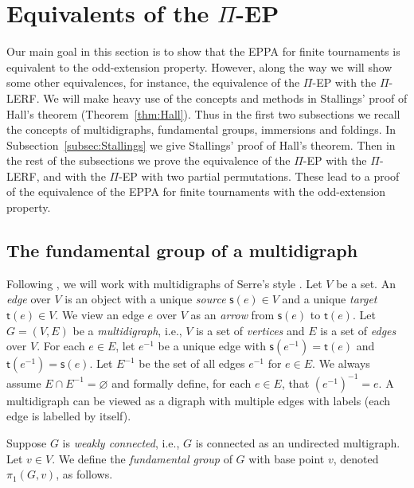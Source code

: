 \documentclass[10pt,a4paper]{amsart}
\theoremstyle{definition}
\theoremstyle{definition}
\numberwithin{equation}{section}
\begin{document}
\section{Equivalents of the $\Pi$-EP}
Our main goal in this section is to show that the EPPA for finite tournaments is equivalent to the odd-extension property. However, along the way we will show some other equivalences, for instance, the equivalence of the $\Pi$-EP with the $\Pi$-LERF. We will make heavy use of the concepts and methods in Stallings' proof \cite[Corollary 6.3]{St83} of Hall's theorem \cite{Ha49} (Theorem~\ref{thm:Hall}). Thus in the first two subsections we recall the concepts of multidigraphs, fundamental groups, immersions and foldings. In Subsection~\ref{subsec:Stallings} we give Stallings' proof of Hall's theorem. Then in the rest of the subsections we prove the equivalence of the $\Pi$-EP with the $\Pi$-LERF, and with the $\Pi$-EP with two partial permutations. These lead to a proof of the equivalence of the EPPA for finite tournaments with the odd-extension property. 




\subsection{The fundamental group of a multidigraph\label{subsec:multidigraph}} Following \cite{St83}, we will work with multidigraphs of Serre's style \cite{SerreBook}. Let $V$ be a set. An {\em edge} over $V$ is an object with a unique {\em source} $\mathsf{s}(e)\in V$ and a unique {\em target} $\mathsf{t}(e)\in V$. We view an edge $e$ over $V$ as an {\em arrow} from $\mathsf{s}(e)$ to $\mathsf{t}(e)$. Let $G=(V,E)$ be a {\em multidigraph}, i.e., $V$ is a set of {\em vertices} and $E$ is a set of {\em edges} over $V$.  For each $e\in E$, let $e^{-1}$ be a unique edge with $\mathsf{s}(e^{-1})=\mathsf{t}(e)$ and $\mathsf{t}(e^{-1})=\mathsf{s}(e)$. Let $E^{-1}$ be the set of all edges $e^{-1}$ for $e\in E$. We always assume $E\cap E^{-1}=\varnothing$ and formally define, for each $e\in E$, that $(e^{-1})^{-1}=e$. A multidigraph can be viewed as a digraph with multiple edges with labels (each edge is labelled by itself). 



Suppose $G$ is {\em weakly connected}, i.e., $G$ is connected as an undirected multigraph. Let $v\in V$. We define the {\em fundamental group} of $G$ with base point $v$, denoted $\pi_1(G, v)$, as follows. 
\end{document}
